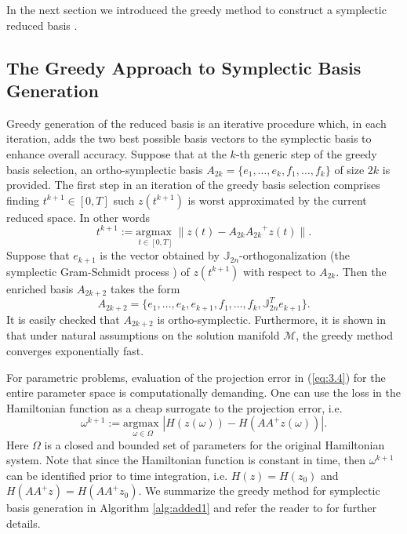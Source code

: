 In the next section we introduced the greedy method to construct a symplectic reduced basis \cite{Maboudi:2016}.

\subsection{The Greedy Approach to Symplectic Basis Generation} \label{sec:3.2}
Greedy generation of the reduced basis is an iterative procedure which, in each iteration, adds the two best possible basis vectors to the symplectic basis to enhance overall accuracy. Suppose that at the $k$-th generic step of the greedy basis selection, an ortho-symplectic basis $A_{2k} = \{ e_1,\dots,e_k,f_1,\dots,f_k\}$ of size $2k$ is provided. The first step in an iteration of the greedy basis selection comprises finding $t^{k+1}\in[0,T]$ such $z(t^{k+1})$ is worst approximated by the current reduced space. In other words
\begin{equation} \label{eq:3.4}
	t^{k+1} := \underset{t\in [0,T]}{\text{argmax }} \| z(t) - A_{2k}{A_{2k}}^+z(t) \|.
\end{equation}
Suppose that $e_{k+1}$ is the vector obtained by $\mathbb J_{2n}$-orthogonalization (the symplectic Gram-Schmidt process \cite{Salam2014}) of $z(t^{k+1})$ with respect to $A_{2k}$. Then the enriched basis $A_{2k+2}$ takes the form
\begin{equation}
	A_{2k+2} = \{ e_1,\dots,e_k, e_{k+1},f_1,\dots,f_k,\mathbb J_{2n}^T e_{k+1}\}.
\end{equation}
It is easily checked that $A_{2k+2}$ is ortho-symplectic. Furthermore, it is shown in \cite{Maboudi:2016} that under natural assumptions on the solution manifold $\mathcal M$, the greedy method converges exponentially fast.

For parametric problems, evaluation of the projection error in (\ref{eq:3.4}) for the entire parameter space is computationally demanding. One can use the loss in the Hamiltonian function as a cheap surrogate to the projection error, i.e.
\begin{equation}
	\omega^{k+1} := \underset{\omega\in \Omega}{\text{argmax }} | H(z(\omega)) - H(AA^+z(\omega)) |.
\end{equation}
Here $\Omega$ is a closed and bounded set of parameters for the original Hamiltonian system. Note that since the Hamiltonian function is constant in time, then $\omega^{k+1}$ can be identified prior to time integration, i.e. $H(z) = H(z_0)$ and $H(AA^+z) = H(AA^+z_0)$. We summarize the greedy method for symplectic basis generation in Algorithm \ref{alg:added1} and refer the reader to \cite{Maboudi:2016} for further details.



